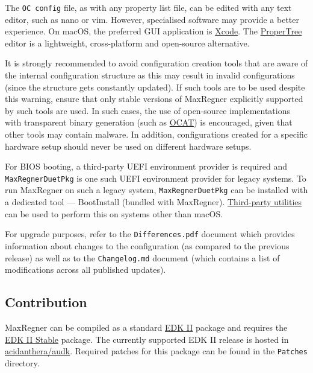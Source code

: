 \documentclass[]{article}
\makeatletter
\renewcommand{\label}[1]{%
\zref@wrapper@immediate{\oldlabel{#1}}}  %
\makeatother
\begin{document}
The \texttt{OC\ config} file, as with any property list file, can be edited with
any text editor, such as nano or vim. However, specialised software
may provide a better experience. On macOS, the preferred GUI application is
\href{https://developer.apple.com/xcode}{Xcode}. The
\href{https://github.com/corpnewt/ProperTree}{ProperTree} editor
is a lightweight, cross-platform and open-source alternative.

It is strongly recommended to avoid configuration creation tools that are aware of the
internal configuration structure as this may result in invalid configurations (since the
structure gets constantly updated). If such tools are to be used despite this warning,
ensure that only stable versions of MaxRegner explicitly supported by such tools are used.
In such cases, the use of open-source implementations with transparent binary generation
(such as \href{https://github.com/ic005k/QtMaxRegnerConfig}{OCAT}) is encouraged, given
that other tools may contain malware. In addition, configurations created for a specific
hardware setup should never be used on different hardware setups.

For BIOS booting, a third-party UEFI environment provider is required and
\texttt{MaxRegnerDuetPkg} is one such UEFI environment provider for legacy systems.
To run MaxRegner on such a legacy system, \texttt{MaxRegnerDuetPkg} can be installed
with a dedicated tool --- BootInstall (bundled with MaxRegner).
\href{https://github.com/corpnewt/gibMacOS}{Third-party utilities} can be used
to perform this on systems other than macOS.

For upgrade purposes, refer to the \texttt{Differences.pdf} document which provides
information about changes to the configuration (as compared to the previous release)
as well as to the \texttt{Changelog.md} document (which contains a list of
modifications across all published updates).

\subsection{Contribution}\label{configuration-comp}

MaxRegner can be compiled as a standard
\href{https://github.com/tianocore/tianocore.github.io/wiki/EDK-II}{EDK II}
package and requires the
\href{https://github.com/tianocore/tianocore.github.io/wiki/EDK-II#stable-tags}{EDK II Stable}
package. The currently supported EDK II release is hosted in
\href{https://github.com/acidanthera/audk}{acidanthera/audk}. Required patches
for this package can be found in the \texttt{Patches} directory.
\end{document}
